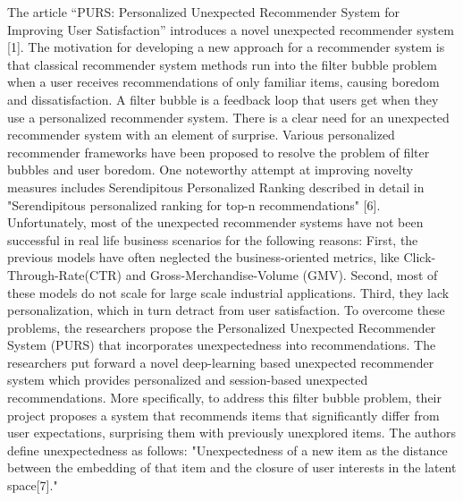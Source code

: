 The article “PURS: Personalized Unexpected Recommender System for Improving User Satisfaction” introduces a novel unexpected recommender system [1]. The motivation for developing a new approach for a recommender system is that classical recommender system methods run into the filter bubble problem when a user receives recommendations of only familiar items, causing boredom and dissatisfaction. A filter bubble is a feedback loop that users get when they use a personalized recommender system. There is a clear need for an unexpected recommender system with an element of surprise. Various personalized recommender frameworks have been proposed to resolve the problem of filter bubbles and user boredom. One noteworthy attempt at improving novelty measures includes Serendipitous Personalized Ranking described in detail in "Serendipitous personalized ranking for top-n recommendations" [6].
Unfortunately, most of the unexpected recommender systems have not been successful in real life business scenarios for the following reasons: First, the previous models have often neglected the business-oriented metrics, like  Click-Through-Rate(CTR) and Gross-Merchandise-Volume (GMV). Second, most of these models do not scale for large scale industrial applications. Third, they lack personalization, which in turn detract from user satisfaction. To overcome these problems, the researchers propose the Personalized Unexpected Recommender System (PURS) that incorporates unexpectedness into recommendations. The researchers put forward a novel deep-learning based unexpected recommender system which provides personalized and session-based unexpected recommendations. More specifically, to address this filter bubble problem, their project proposes a system that recommends items that significantly differ from user expectations, surprising them with previously unexplored items. The authors define unexpectedness as follows: "Unexpectedness of a new item as the distance between the embedding of that item and the closure of user interests in the latent space[7]." 
	

